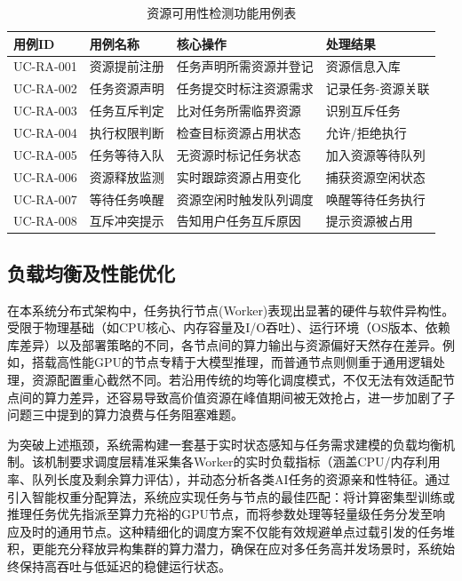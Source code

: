 \begin{table}[htbp]
    \centering
    \caption{资源可用性检测功能用例表}
    \begin{tabular}{llll}
        \toprule
        \textbf{用例ID} & \textbf{用例名称} & \textbf{核心操作} & \textbf{处理结果} \\
        \midrule
        UC-RA-001 & 资源提前注册 & 任务声明所需资源并登记 & 资源信息入库 \\
        UC-RA-002 & 任务资源声明 & 任务提交时标注资源需求 & 记录任务-资源关联 \\
        UC-RA-003 & 任务互斥判定 & 比对任务所需临界资源 & 识别互斥任务 \\
        UC-RA-004 & 执行权限判断 & 检查目标资源占用状态 & 允许/拒绝执行 \\
        UC-RA-005 & 任务等待入队 & 无资源时标记任务状态 & 加入资源等待队列 \\
        UC-RA-006 & 资源释放监测 & 实时跟踪资源占用变化 & 捕获资源空闲状态 \\
        UC-RA-007 & 等待任务唤醒 & 资源空闲时触发队列调度 & 唤醒等待任务执行 \\
        UC-RA-008 & 互斥冲突提示 & 告知用户任务互斥原因 & 提示资源被占用 \\
        \bottomrule
    \end{tabular}
    \label{tab:resource_availability_cases}
\end{table}

\subsection{负载均衡及性能优化}

在本系统分布式架构中，任务执行节点(Worker)表现出显著的硬件与软件异构性。受限于物理基础（如CPU核心、内存容量及I/O吞吐）、运行环境（OS版本、依赖库差异）以及部署策略的不同，各节点间的算力输出与资源偏好天然存在差异。例如，搭载高性能GPU的节点专精于大模型推理，而普通节点则侧重于通用逻辑处理，资源配置重心截然不同。若沿用传统的均等化调度模式，不仅无法有效适配节点间的算力差异，还容易导致高价值资源在峰值期间被无效抢占，进一步加剧了子问题三中提到的算力浪费与任务阻塞难题。

为突破上述瓶颈，系统需构建一套基于实时状态感知与任务需求建模的负载均衡机制。该机制要求调度层精准采集各Worker的实时负载指标（涵盖CPU/内存利用率、队列长度及剩余算力评估），并动态分析各类AI任务的资源亲和性特征。通过引入智能权重分配算法，系统应实现任务与节点的最佳匹配：将计算密集型训练或推理任务优先指派至算力充裕的GPU节点，而将参数处理等轻量级任务分发至响应及时的通用节点。这种精细化的调度方案不仅能有效规避单点过载引发的任务堆积，更能充分释放异构集群的算力潜力，确保在应对多任务高并发场景时，系统始终保持高吞吐与低延迟的稳健运行状态。

